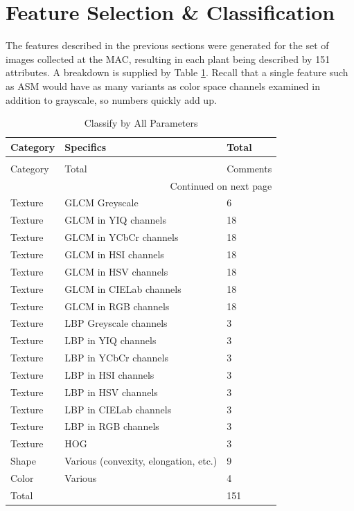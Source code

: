 \documentclass[letterpaper]{report}
\begin{document}
\section{Feature Selection \& Classification}
The features described in the previous sections were generated for the set of images collected at the \gls{MAC}, resulting in each plant being described by 151 attributes. A breakdown is supplied by Table \ref{table:parameters}. Recall that a single feature such as \gls{ASM} would have as many variants as color space channels examined in addition to grayscale, so numbers quickly add up. 
\begin{longtable}{lll}
\caption[Parameters Considered for Classification]{Parameters Considered for Classification}
\label{table:parameters}\\
\toprule
   Category &  Specifics & Total\\
\midrule
\endfirsthead
\caption[]{Classify by All Parameters} \\
\toprule
   Category &  Total & Comments\\
\midrule
\endhead
\midrule
\multicolumn{3}{r}{{Continued on next page}} \\
\midrule
\endfoot

\bottomrule
\endlastfoot
Texture & GLCM Greyscale & 6 \\
Texture & GLCM in YIQ channels & 18 \\
Texture & GLCM in YCbCr channels& 18 \\
Texture & GLCM in HSI channels& 18 \\
Texture & GLCM in HSV channels& 18\\
Texture & GLCM in CIELab channels& 18 \\
Texture & GLCM in RGB channels& 18 \\
Texture & LBP Greyscale channels& 3 \\
Texture & LBP in YIQ channels& 3 \\
Texture & LBP in YCbCr channels& 3 \\
Texture & LBP in HSI channels& 3 \\
Texture & LBP in HSV channels& 3 \\
Texture & LBP in CIELab channels& 3 \\
Texture & LBP in RGB channels& 3 \\
Texture & HOG & 3 \\
Shape & Various (convexity, elongation, etc.) & 9 \\
Color & Various & 4 \\
\midrule
Total& & 151\\
\bottomrule
\end{longtable}
\end{document}
